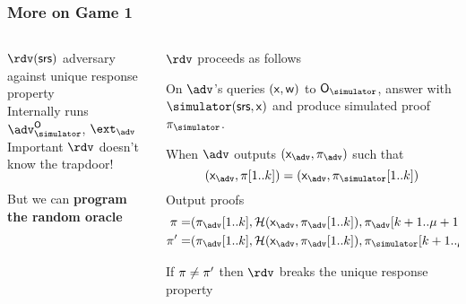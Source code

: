 \documentclass[aspectratio=169]{beamer}
\renewcommand{\emph}[1]{\textbf{#1}}
\renewcommand{\myskip}{0.5\baselineskip}
\begin{document}
\begin{frame}
  \frametitle{More on Game 1}
  \begin{columns}
    \begin{column}{0.5\linewidth}
      $\rdv(\srs)$ adversary against unique response property\\
      Internally runs $\adv^\oracles$, $\exta$\\[\myskip]

      \alert{Important} $\rdv$ doesn't know the trapdoor!\\[\myskip]

      \\[\myskip]

      But we can \emph{program the random oracle}
    \end{column}\pause
    \begin{column}{0.6\linewidth}
      $\rdv$ proceeds as follows
      \begin{compactitem}
      \item On $\adv$'s queries $(\mathsf{x}, \mathsf{w})$ to $\oracles$, answer with
        $\simulator(\srs, \inp)$ and produce simulated proof $\zkproofs$.
      \item When $\adv$ outputs $(\inpa, \zkproofa)$ such that
          \[
            (\inpa, \zkproof[1..k]) = (\inpa, \zkproofs[1..k])
          \]
          Output proofs
          \begin{align*}
            \zkproof = &(\zkproofa[1..k], \ro(\inpa,
            \zkproofa[1..k]), \zkproofa[k + 1..\mu + 1]) \\
            \zkproof' = & (\zkproofa[1..k], \ro(\inpa, \zkproofa[1..k]),
            \zkproofs[k + 1..\mu + 1])
          \end{align*}
        \end{compactitem}
        If $\pi \neq \pi'$ then $\rdv$ breaks the unique response
        property
    \end{column}
  \end{columns}
\end{frame}
\end{document}
